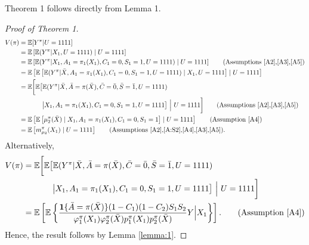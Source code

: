 \documentclass{article}
\newcommand{\pk}{{\varphi}}
\newcommand{\E}{\mathbb{E}}
\newcommand{\tred}{{}}   %
\begin{document}
Theorem 1 follows directly from Lemma 1.
\begin{proof}[Proof of Theorem 1]
\begin{align*}
	V(\pi) 
	&= \mathbb E[Y^{\pi} | U=1111] \\
	&= \mathbb E\left[ \mathbb E( Y^{\pi} | X_1, U=1111) \mid U=1111 \right] \\
	&= \mathbb E\left[ \mathbb E( Y^{\pi} | X_1, A_1=\pi_1(X_1), C_1=0, S_1=1, U=1111) \mid U=1111 \right]  \tag{Assumptions \ref{A2},\ref{A3},\ref{A5}}\\%
	&= \mathbb E\left[ \mathbb E\left[ \mathbb E( Y^{\pi} | \bar X, A_1=\pi_1(X_1), C_1=0, S_1=1, U=1111) \mid X_1, U=1111 \right] \mid U=1111 \right]   \\
	&= \mathbb E\bigg[ \mathbb E\big[ \mathbb E( Y^{\pi} | \bar X, \bar A=\pi(\bar X), \bar C=\bar0, \bar S=\bar1, U=1111) \\
	&\;\;\quad\qquad \big| X_1, A_1=\pi_1(X_1), C_1=0, S_1=1, U=1111 \big] ~\Big|~ U=1111 \bigg]  \tag{Assumptions \ref{A2},\ref{A3},\ref{A5}}\\%
	&= \mathbb E\left[ \mathbb E\left[ \mu_2^\pi(\bar X) \mid X_1, A_1=\pi_1(X_1), C_1=0, S_1=1 \right] \mid U=1111 \right]  \tag{Assumption \ref{A4}}\\%
	&= \mathbb E\left[ m_{\mu_2}^\pi(X_1) \mid U=1111 \right]  \tag{Assumptions \ref{A2},\ref{A:S2},\ref{A4},\ref{A3},\ref{A5}}. %
\end{align*}
\tred{
Alternatively,
\begin{align*}
	V(\pi)
	&= \mathbb E\bigg[ \mathbb E\big[ \mathbb E( Y^{\pi} | \bar X, \bar A=\pi(\bar X), \bar C=\bar0, \bar S=\bar1, U=1111) \\
	&\;\;\quad\qquad \big| X_1, A_1=\pi_1(X_1), C_1=0, S_1=1, U=1111 \big] ~\Big|~ U=1111 \bigg] \\
	&= \E\left[ \E\left\{\frac{\mathbf{1}\{\bar A=\pi(\bar X)\}(1-C_1)(1-C_2)S_1S_2}{\pk_1^\pi(X_1)\pk_2^\pi(\bar X)p_1^\pi(X_1)p_2^\pi(\bar X)} Y \Big| X_1 \right\} \right].  \tag{Assumption \ref{A4}}
\end{align*}
}
Hence, the result follows by Lemma \ref{lemma:1}.
\end{proof}
	

	
%
\end{document}
